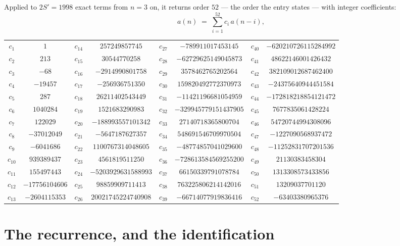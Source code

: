 \documentclass[11pt,a4paper]{article}
\theoremstyle{plain}
\theoremstyle{definition}
\begin{document}
Applied to $2S'=1998$ exact terms from $n=3$ on, it returns order $52$ --- the
order the entry states --- with integer coefficients:
\[
a(n)\;=\;\sum_{i=1}^{52}c_i\,a(n-i),
\]
\begin{center}\small
\begin{tabular}{cccccccc}
$c_{1}$ & $1$ & $c_{14}$ & $257249857745$ & $c_{27}$ & $-789911017453145$ & $c_{40}$ & $-620210726115284992$ \\
$c_{2}$ & $213$ & $c_{15}$ & $30544770258$ & $c_{28}$ & $-62729625149045873$ & $c_{41}$ & $48622146001426432$ \\
$c_{3}$ & $-68$ & $c_{16}$ & $-2914990801758$ & $c_{29}$ & $3578462765202564$ & $c_{42}$ & $382109012687462400$ \\
$c_{4}$ & $-19457$ & $c_{17}$ & $-256936751350$ & $c_{30}$ & $159820492772370973$ & $c_{43}$ & $-24375640944451584$ \\
$c_{5}$ & $287$ & $c_{18}$ & $26211402543449$ & $c_{31}$ & $-11421196681054959$ & $c_{44}$ & $-172818218854121472$ \\
$c_{6}$ & $1040284$ & $c_{19}$ & $1521683290983$ & $c_{32}$ & $-329945779151437905$ & $c_{45}$ & $7677835061428224$ \\
$c_{7}$ & $122029$ & $c_{20}$ & $-188993557101342$ & $c_{33}$ & $27140718365800704$ & $c_{46}$ & $54720744994308096$ \\
$c_{8}$ & $-37012049$ & $c_{21}$ & $-5647187627357$ & $c_{34}$ & $548691546709970504$ & $c_{47}$ & $-1227090568937472$ \\
$c_{9}$ & $-6041686$ & $c_{22}$ & $1100767314048605$ & $c_{35}$ & $-48774857041029600$ & $c_{48}$ & $-11252831707201536$ \\
$c_{10}$ & $939389437$ & $c_{23}$ & $4561819511250$ & $c_{36}$ & $-728613584569255200$ & $c_{49}$ & $21130383458304$ \\
$c_{11}$ & $155497443$ & $c_{24}$ & $-5203929631588993$ & $c_{37}$ & $66150339791078784$ & $c_{50}$ & $1313308573433856$ \\
$c_{12}$ & $-17756104606$ & $c_{25}$ & $98859909711413$ & $c_{38}$ & $763225806214142016$ & $c_{51}$ & $13209037701120$ \\
$c_{13}$ & $-2604115353$ & $c_{26}$ & $20021745224740908$ & $c_{39}$ & $-66714077919836416$ & $c_{52}$ & $-63403380965376$ \\
\end{tabular}
\end{center}

\section{The recurrence, and the identification}
\end{document}
